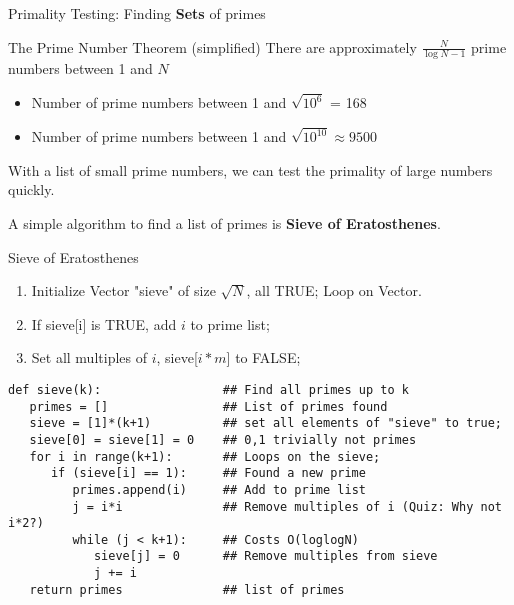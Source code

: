 \begin{frame}{Primality Testing: Finding {\bf Sets} of primes}

  \begin{block}{The Prime Number Theorem (simplified)}
    There are approximately $\frac{N}{\log{N}-1}$ prime numbers between 1 and $N$
  \end{block}\bigskip

  \begin{itemize}
    \item Number of prime numbers between 1 and $\sqrt{10^6}$ = 168
    \item Number of prime numbers between 1 and $\sqrt{10^{10}} \approx 9500$
  \end{itemize}\bigskip

  With a list of small prime numbers, we can test the primality of large numbers quickly.\bigskip


  A simple algorithm to find a list of primes is {\bf Sieve of Eratosthenes}.
\end{frame}



\begin{frame}[fragile]{Sieve of Eratosthenes}

    \begin{enumerate}
      \item Initialize Vector "sieve" of size $\sqrt{N}$, all TRUE; Loop on Vector.
      \item If sieve[i] is TRUE, add $i$ to prime list;
      \item Set all multiples of $i$, sieve[$i*m$] to FALSE;
    \end{enumerate}

    {\smaller
  \begin{exampleblock}{}
\begin{verbatim}
def sieve(k):                 ## Find all primes up to k
   primes = []                ## List of primes found
   sieve = [1]*(k+1)          ## set all elements of "sieve" to true;
   sieve[0] = sieve[1] = 0    ## 0,1 trivially not primes
   for i in range(k+1):       ## Loops on the sieve;
      if (sieve[i] == 1):     ## Found a new prime
         primes.append(i)     ## Add to prime list
         j = i*i              ## Remove multiples of i (Quiz: Why not i*2?)
         while (j < k+1):     ## Costs O(loglogN)
            sieve[j] = 0      ## Remove multiples from sieve
            j += i
   return primes              ## list of primes
\end{verbatim}
  \end{exampleblock}
  }
\end{frame}

